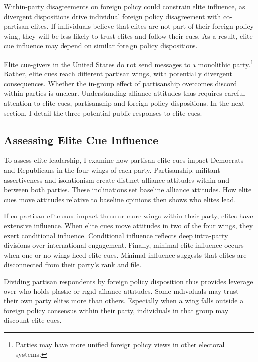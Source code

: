 \documentclass[12pt]{article}
\begin{document}
Within-party disagreements on foreign policy could constrain elite influence, as divergent dispositions drive individual foreign policy disagreement with co-partisan elites.
If individuals believe that elites are not part of their foreign policy wing, they will be less likely to trust elites and follow their cues. 
As a result, elite cue influence may depend on similar foreign policy dispositions.


Elite cue-givers in the United States do not send messages to a monolithic party.\footnote{Parties may have more unified foreign policy views in other electoral systems.}
Rather, elite cues reach different partisan wings, with potentially divergent consequences. 
Whether the in-group effect of partisanship overcomes discord within parties is unclear. 
Understanding alliance attitudes thus requires careful attention to elite cues, partisanship and foreign policy dispositions. 
In the next section, I detail the three potential public responses to elite cues. 




\subsection{Assessing Elite Cue Influence}


To assess elite leadership, I examine how partisan elite cues impact Democrats and Republicans in the four wings of each party.
Partisanship, militant assertiveness and isolationism create distinct alliance attitudes within and between both parties. 
These inclinations set baseline alliance attitudes. 
How elite cues move attitudes relative to baseline opinions then shows who elites lead. 


If co-partisan elite cues impact three or more wings within their party, elites have extensive influence. 
When elite cues move attitudes in two of the four wings, they exert conditional influence. 
Conditional influence reflects deep intra-party divisions over international engagement. 
Finally, minimal elite influence occurs when one or no wings heed elite cues.
Minimal influence suggests that elites are disconnected from their party's rank and file.


Dividing partisan respondents by foreign policy disposition thus provides leverage over who holds plastic or rigid alliance attitudes. 
Some individuals may trust their own party elites more than others. 
Especially when a wing falls outside a foreign policy consensus within their party, individuals in that group may discount elite cues.
\end{document}
